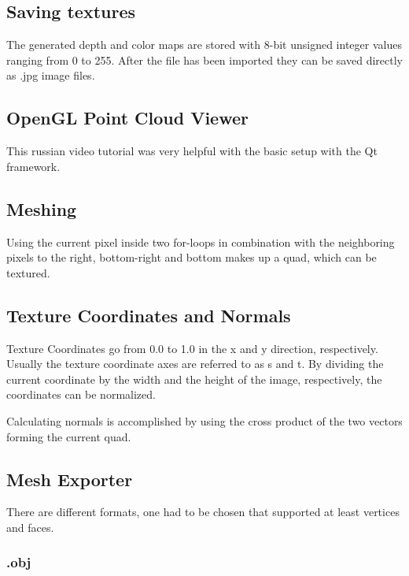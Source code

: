 \subsection{Saving textures}

The generated depth and color maps are stored with 8-bit unsigned integer values ranging from 0 to 255. After the file has been imported they can be saved directly as .jpg image files.

\subsection{OpenGL Point Cloud Viewer}

This russian video tutorial was very helpful with the basic setup with the Qt framework.

\cite{ytQtOpenGL}

\subsection{Meshing}

Using the current pixel inside two for-loops in combination with the neighboring pixels to the right, bottom-right and bottom makes up a quad, which can be textured.

\subsection{Texture Coordinates and Normals}

Texture Coordinates go from 0.0 to 1.0 in the x and y direction, respectively. Usually the texture coordinate axes are referred to as s and t. By dividing the current coordinate by the width and the height of the image, respectively, the coordinates can be normalized.

Calculating normals is accomplished by using the cross product of the two vectors forming the current quad.

\subsection{Mesh Exporter}

There are different formats, one had to be chosen that supported at least vertices and faces.

\subsubsection{.obj}

